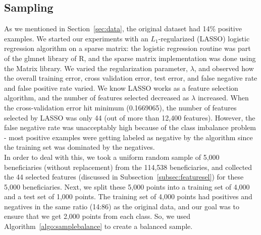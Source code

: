 \subsection{Sampling}
\label{subsec:sampling}
As we mentioned in Section~\ref{sec:data}, the original dataset had 14\% positive examples. We started our experiments with an $L_1$-regularized (LASSO) logistic regression algorithm on a sparse matrix: the logistic regression routine was part of the glmnet \cite{glmnet} library of R, and the sparse matrix implementation was done using the Matrix \cite{matrix} library. We varied the regularization parameter, $\lambda$, and observed how the overall training error, cross validation error, test error, and false negative rate and false positive rate varied. We know LASSO works as a feature selection algorithm, and the number of features selected decreased as $\lambda$ increased. When the cross-validation error hit minimum (0.1669065), the number of features selected by LASSO was only 44 (out of more than 12,400 features). However, the false negative rate was unacceptably high because of the class imbalance problem - most positive examples were getting labeled as negative by the algorithm since the training set was dominated by the negatives.\\

In order to deal with this, we took a uniform random sample of 5,000 beneficiaries (without replacement) from the 114,538 beneficiaries, and collected the 44 selected features (discussed in Subsection~\ref{subsec:featuresel}) for these 5,000 beneficiaries. Next, we split these 5,000 points into a training set of 4,000 and a test set of 1,000 points. The training set of 4,000 points had positives and negatives in the same ratio (14:86) as the original data, and our goal was to ensure that we get 2,000 points from each class. So, we used Algorithm~\ref{algo:samplebalance} to create a balanced sample.


